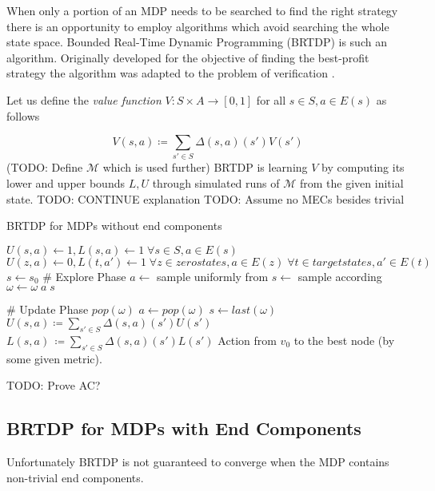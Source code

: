 When only a portion of an MDP needs to be searched to find the right
strategy there is an opportunity to employ algorithms which avoid
searching the whole state space. Bounded Real-Time Dynamic Programming
(BRTDP) is such an algorithm. Originally developed for
the objective of finding the best-profit strategy
\parencite{profit_brtdp} the algorithm was adapted to the problem of
verification \parencite{atva14}.

Let us define the {\em value function} $V : S \times A \to
[0,1]$ for all $s \in S, a \in E(s)$ as follows

\[
    V(s,a) \coloneqq \sum_{s' \in S} \Delta(s,a)(s')V(s')
\]
(TODO: Define $\mathcal{M}$ which is used further)
BRTDP is learning $V$ by computing its lower and upper bounds $L, U$
through simulated runs of $\mathcal{M}$ from the given initial state.
TODO: CONTINUE explanation
TODO: Assume no MECs besides trivial

\begin{algorithm}
\caption{BRTDP for MDPs without end components}
\label{brtdp}
\begin{algorithmic}
\State $U(s,a) \gets 1, L(s,a) \gets 1 \; \forall s \in S, a \in E(s)$
\State $U(z,a) \gets 0, L(t,a') \gets 1
    \; \forall z \in zero states, a \in E(z)
    \; \forall t \in target states, a' \in E(t)$
\State $s \gets s_0$
    \State \# Explore Phase
        \State $a \gets$ sample uniformly from
        \State $s \gets $ sample according
        \State $\omega \gets \omega \; a \; s$
    \EndWhile

    \State \# Update Phase
        \State $pop(\omega)$
        \State $a \gets pop(\omega)$
        \State $s \gets last(\omega)$
        \State $U(s,a) \coloneqq \sum_{s' \in S} \Delta(s,a)(s')U(s')$
        \State $L(s,a)\, \coloneqq \sum_{s' \in S} \Delta(s,a)(s')L(s')$
    \EndWhile
\EndWhile
\State \Return Action from $v_0$ to the best node (by some
given metric).
\end{algorithmic}
\end{algorithm}

TODO: Prove AC?

\subsection*{BRTDP for MDPs with End Components}
Unfortunately BRTDP is not guaranteed to converge when the MDP
contains non-trivial end components.

